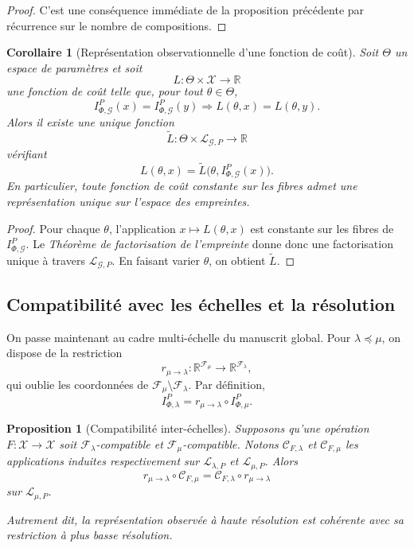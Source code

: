 \documentclass[11pt,a4paper,openany]{book}
\newtheorem{proposition}[definition]{Proposition}
\newtheorem{corollary}[definition]{Corollaire}
\begin{document}
\begin{proof}
C'est une conséquence immédiate de la proposition précédente par récurrence sur le nombre de compositions.
\end{proof}

\begin{corollary}[Représentation observationnelle d'une fonction de coût]
Soit \(\Theta\) un espace de paramètres et soit
\[
L:\Theta\times\mathcal X\longrightarrow \mathbb R
\]
une fonction de coût telle que, pour tout \(\theta\in\Theta\),
\[
I_{\Phi,\mathcal G}^P(x)=I_{\Phi,\mathcal G}^P(y)
\Longrightarrow
L(\theta,x)=L(\theta,y).
\]
Alors il existe une unique fonction
\[
\widetilde L:\Theta\times\mathcal L_{\mathcal G,P}\longrightarrow \mathbb R
\]
vérifiant
\[
L(\theta,x)=\widetilde L\bigl(\theta,I_{\Phi,\mathcal G}^P(x)\bigr).
\]
En particulier, toute fonction de coût constante sur les fibres admet une représentation unique sur l'espace des empreintes.
\end{corollary}

\begin{proof}
Pour chaque \(\theta\), l'application \(x\mapsto L(\theta,x)\) est constante sur les fibres de \(I_{\Phi,\mathcal G}^P\). Le \emph{Théorème de factorisation de l'empreinte} donne donc une factorisation unique à travers \(\mathcal L_{\mathcal G,P}\). En faisant varier \(\theta\), on obtient \(\widetilde L\).
\end{proof}

\subsection{Compatibilité avec les échelles et la résolution}

On passe maintenant au cadre multi-échelle du manuscrit global. Pour \(\lambda\preceq\mu\), on dispose de la restriction
\[
r_{\mu\to\lambda}:\mathbb R^{\mathcal F_\mu}\longrightarrow \mathbb R^{\mathcal F_\lambda},
\]
qui oublie les coordonnées de \(\mathcal F_\mu\setminus\mathcal F_\lambda\). Par définition,
\[
I_{\Phi,\lambda}^P=r_{\mu\to\lambda}\circ I_{\Phi,\mu}^P.
\]

\begin{proposition}[Compatibilité inter-échelles]
\label{prop:inter-echelles}
Supposons qu'une opération \(F:\mathcal X\to\mathcal X\) soit \(\mathcal F_\lambda\)-compatible et \(\mathcal F_\mu\)-compatible. Notons \(\mathcal C_{F,\lambda}\) et \(\mathcal C_{F,\mu}\) les applications induites respectivement sur \(\mathcal L_{\lambda,P}\) et \(\mathcal L_{\mu,P}\). Alors
\[
r_{\mu\to\lambda}\circ \mathcal C_{F,\mu}
=
\mathcal C_{F,\lambda}\circ r_{\mu\to\lambda}
\]
sur \(\mathcal L_{\mu,P}\).

Autrement dit, la représentation observée à haute résolution est cohérente avec sa restriction à plus basse résolution.
\end{proposition}
\end{document}

